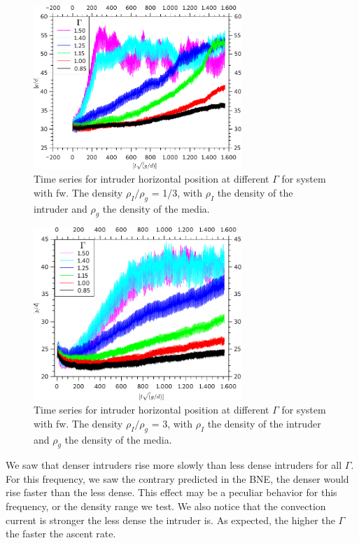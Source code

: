 \begin{figure}[H]
    \centering
    \includegraphics[width=0.7\textwidth]{04-figuras/BNE25000D1-3.pdf}
    \caption[BNE with frictional walls: $\rho_I/\rho_g$ = 1/3.]{Time series for intruder horizontal position at different $\Gamma$ for system with fw. The density $\rho_I/\rho_g$ = 1/3, with $\rho_I$ the density of the intruder and $\rho_g$ the density of the media.}
    \label{fig:BNE25000_Parede_Densidade1-3}
\end{figure}

\begin{figure}[H]
    \centering
    \includegraphics[width=0.7\textwidth]{04-figuras/BNE25000D3.pdf}
    \caption[BNE with frictional walls: $\rho_I/\rho_g$ = 1.]{Time series for intruder horizontal position at different $\Gamma$ for system with fw. The density $\rho_I/\rho_g$ = 3, with $\rho_I$ the density of the intruder and $\rho_g$ the density of the media.}
    \label{fig:BNE25000_Parede_Densidade3}
\end{figure}

    We saw that denser intruders rise more slowly than less dense intruders for all $\Gamma$. For this frequency, we saw the contrary predicted in the BNE, the denser would rise faster than the less dense. This effect may be a peculiar behavior for this frequency, or the density range we test. We also notice that the convection current is stronger the less dense the intruder is. As expected, the higher the $\Gamma$ the faster the ascent rate.

